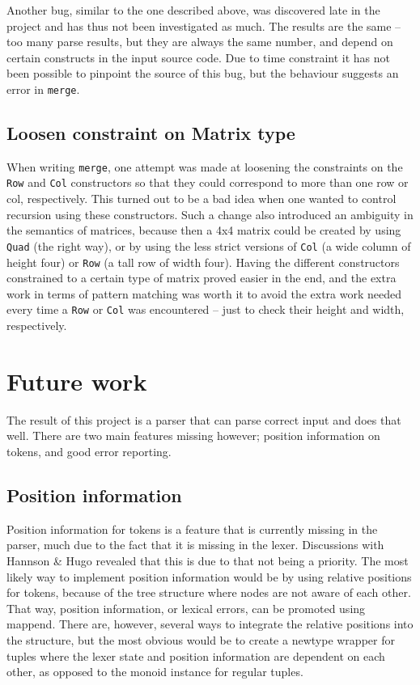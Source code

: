 \documentclass[a4paper,12pt,twosided]{report}
\begin{document}
Another bug, similar to the one described above, was discovered late in the
project and has thus not been investigated as much. The results are the same --
too many parse results, but they are always the same number, and depend on
certain constructs in the input source code. Due to time constraint it has not
been possible to pinpoint the source of this bug, but the behaviour suggests an
error in \texttt{merge}. \label{branchbug}

\subsection{Loosen constraint on Matrix type}
When writing \texttt{merge}, one attempt was made at loosening the constraints
on the \texttt{Row} and \texttt{Col} constructors so that they could correspond
to more than one row or col, respectively. This turned out to be a bad idea when
one wanted to control recursion using these constructors. Such a change also
introduced an ambiguity in the semantics of matrices, because then a 4x4 matrix
could be created by using \texttt{Quad} (the right way), or by using the less
strict versions of \texttt{Col} (a wide column of height four) or \texttt{Row}
(a tall row of width four). Having the different constructors constrained to a
certain type of matrix proved easier in the end, and the extra work in terms of
pattern matching was worth it to avoid the extra work needed every time a
\texttt{Row} or \texttt{Col} was encountered -- just to check their height and
width, respectively.  

\section{Future work}
\label{futurework}
The result of this project is a parser that can parse correct input and does
that well. There are two main features missing however; position information on
tokens, and good error reporting.

\subsection{Position information}
Position information for tokens is a feature that is currently missing in the
parser, much due to the fact that it is missing in the lexer. Discussions with
Hannson \& Hugo revealed that this is due to that not being a priority. The
most likely way to implement position information would be by using relative
positions for tokens, because of the tree structure where nodes are not aware of
each other. That way, position information, or lexical errors, can be promoted
using mappend. There are, however, several ways to integrate the relative
positions into the structure, but the most obvious would be to create a newtype
wrapper for tuples where the lexer state and position information are dependent
on each other, as opposed to the monoid instance for regular tuples. 
\end{document}
